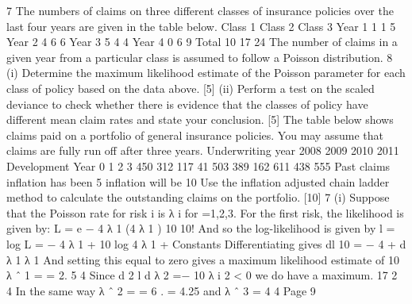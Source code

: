 \documentclass[a4paper,12pt]{article}
\begin{document}
\begin{enumerate}
7
The numbers of claims on three different classes of insurance policies over the last
four years are given in the table below.
Class 1
Class 2
Class 3
Year 1
1
1
5
Year 2
4
6
6
Year 3
5
4
4
Year 4
0
6
9
Total
10
17
24
The number of claims in a given year from a particular class is assumed to follow a
Poisson distribution.
8
(i) Determine the maximum likelihood estimate of the Poisson parameter for each
class of policy based on the data above.
[5]
(ii) Perform a test on the scaled deviance to check whether there is evidence that
the classes of policy have different mean claim rates and state your
conclusion.
[5]
The table below shows claims paid on a portfolio of general insurance policies. You
may assume that claims are fully run off after three years.
Underwriting year
2008
2009
2010
2011
Development Year
0
1
2
3
450 312 117 41
503 389 162
611 438
555
Past claims inflation has been 5%
inflation will be 10%
Use the inflation adjusted chain ladder method to calculate the outstanding claims on
the portfolio.
[10]
7
(i)
Suppose that the Poisson rate for risk i is λ i for =1,2,3.
For the first risk, the likelihood is given by:
L = e − 4 λ 1
(4 λ 1 ) 10
10!
And so the log-likelihood is given by
l = log L = − 4 λ 1 + 10 log 4 λ 1 + Constants
Differentiating gives
dl
10
= − 4 +
d λ 1
λ 1
And setting this equal to zero gives a maximum likelihood estimate of
10
λ ˆ 1 =
= 2. 5
4
Since
d 2 l
d λ
2
=−
10
λ i 2
< 0 we do have a maximum.
17
2 4
In the same way λ ˆ 2 =
= 6 .
= 4.25 and λ ˆ 3 =
4
4
Page 9


\end{enumerate}
\end{document}
